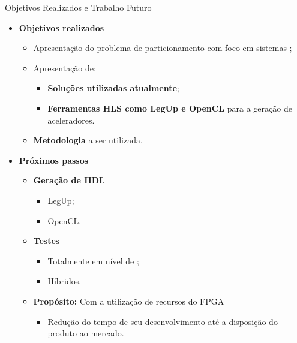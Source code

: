    \begin{frame}{Objetivos Realizados e Trabalho Futuro} \vspace{-1em}
      \begin{itemize} \setlength{\itemsep}{0.8em}
         
         \item \textbf{Objetivos realizados}
         \begin{itemize}
            \item Apresentação do problema de particionamento com foco em sistemas \wearables;
            
            \item Apresentação de:
            \begin{itemize}
               \item \textbf{Soluções utilizadas atualmente};
               \item \textbf{Ferramentas HLS como LegUp e OpenCL} para a geração de aceleradores.
            \end{itemize}
            
            \item \textbf{Metodologia} a ser utilizada.
         \end{itemize}
         
         \item \textbf{Próximos passos}
         \begin{itemize}
            
            \item \textbf{Geração de HDL}
            \begin{itemize}
               \item LegUp;
               \item OpenCL.
            \end{itemize}
            
            \item \textbf{Testes}
            \begin{itemize}
               \item Totalmente em nível de \software;
               \item Híbridos.
            \end{itemize}
            
            \item \textbf{Propósito:} Com a utilização de recursos do FPGA %
            \begin{itemize}
               \item Redução do tempo de seu desenvolvimento até a disposição do produto ao mercado.
            \end{itemize}
         \end{itemize}
      \end{itemize}
   \end{frame}
